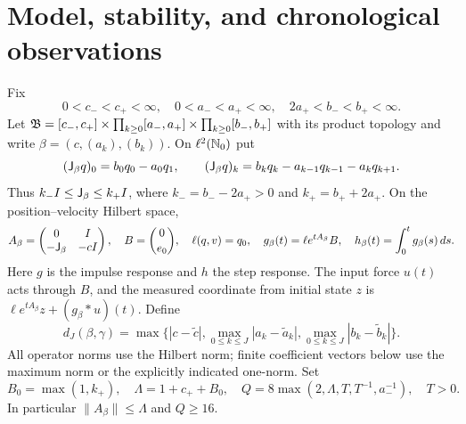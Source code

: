 \section{Model, stability, and chronological observations}
\label{sec:model}
Fix
\[
0<c_-<c_+<\infty,\quad 0<a_-<a_+<\infty,\quad
2a_+<b_-<b_+<\infty.
\]
Let $\mathfrak B=[c_-,c_+]\times\prod_{k\ge0}[a_-,a_+]
\times\prod_{k\ge0}[b_-,b_+]$ with its product topology and write
$\beta=(c,(a_k),(b_k))$. On $\ell^2(\mathbb N_0)$ put
\[
(\mathsf J_\beta q)_0=b_0q_0-a_0q_1,\qquad
(\mathsf J_\beta q)_k=b_kq_k-a_{k-1}q_{k-1}-a_kq_{k+1}.
\]
Thus $k_-I\le\mathsf J_\beta\le k_+I$, where
$k_-=b_--2a_+>0$ and $k_+=b_++2a_+$. On the position--velocity Hilbert space,
\begin{equation}
 A_\beta=\begin{pmatrix}0&I\\-\mathsf J_\beta&-cI\end{pmatrix},\quad
 B=\binom0{e_0},\quad \ell(q,v)=q_0,\quad
 g_\beta(t)=\ell e^{tA_\beta}B,\quad h_\beta(t)=\int_0^t g_\beta(s)\,ds.
 \label{eq:model}
\end{equation}
Here $g$ is the impulse response and $h$ the step response. The input force
$u(t)$ acts through $B$, and the measured coordinate from initial state $z$ is
$\ell e^{tA_\beta}z+(g_\beta*u)(t)$. Define
\[
 d_J(\beta,\gamma)=\max\{|c-\widetilde c|,
 \max_{0\le k\le J}|a_k-\widetilde a_k|,
 \max_{0\le k\le J}|b_k-\widetilde b_k|\}.
\]
All operator norms use the Hilbert norm; finite coefficient vectors below use
the maximum norm or the explicitly indicated one-norm. Set
\begin{equation}
 B_0=\max(1,k_+),\quad \Lambda=1+c_++B_0,\quad
 Q=8\max(2,\Lambda,T,T^{-1},a_-^{-1}),\quad T>0.
 \label{eq:box-constants}
\end{equation}
In particular $\|A_\beta\|\le\Lambda$ and $Q\ge16$.

